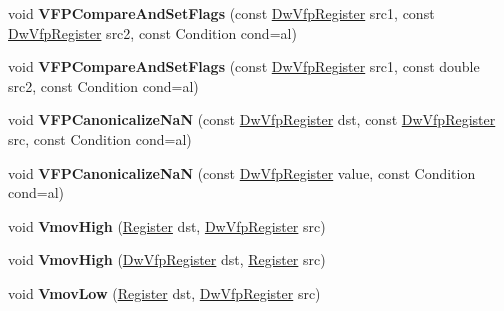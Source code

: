 \begin{DoxyCompactItemize}
void {\bfseries V\+F\+P\+Compare\+And\+Set\+Flags} (const \mbox{\hyperlink{classv8_1_1internal_1_1DwVfpRegister}{Dw\+Vfp\+Register}} src1, const \mbox{\hyperlink{classv8_1_1internal_1_1DwVfpRegister}{Dw\+Vfp\+Register}} src2, const Condition cond=al)
\item 
\mbox{\label{classv8_1_1internal_1_1TurboAssembler_afbe886e5139b5efc592447d5679801e0}} 
void {\bfseries V\+F\+P\+Compare\+And\+Set\+Flags} (const \mbox{\hyperlink{classv8_1_1internal_1_1DwVfpRegister}{Dw\+Vfp\+Register}} src1, const double src2, const Condition cond=al)
\item 
\mbox{\label{classv8_1_1internal_1_1TurboAssembler_a0633ee06e5e86c689c8e8defb1572681}} 
void {\bfseries V\+F\+P\+Canonicalize\+NaN} (const \mbox{\hyperlink{classv8_1_1internal_1_1DwVfpRegister}{Dw\+Vfp\+Register}} dst, const \mbox{\hyperlink{classv8_1_1internal_1_1DwVfpRegister}{Dw\+Vfp\+Register}} src, const Condition cond=al)
\item 
\mbox{\label{classv8_1_1internal_1_1TurboAssembler_a2fa0cfec1d6c47194dc178278c82daf7}} 
void {\bfseries V\+F\+P\+Canonicalize\+NaN} (const \mbox{\hyperlink{classv8_1_1internal_1_1DwVfpRegister}{Dw\+Vfp\+Register}} value, const Condition cond=al)
\item 
\mbox{\label{classv8_1_1internal_1_1TurboAssembler_a9b6bbd965f7ecc8e20c8af6ec03432b0}} 
void {\bfseries Vmov\+High} (\mbox{\hyperlink{classv8_1_1internal_1_1Register}{Register}} dst, \mbox{\hyperlink{classv8_1_1internal_1_1DwVfpRegister}{Dw\+Vfp\+Register}} src)
\item 
\mbox{\label{classv8_1_1internal_1_1TurboAssembler_a3bf659c33385caaea9ae6daa72846d4f}} 
void {\bfseries Vmov\+High} (\mbox{\hyperlink{classv8_1_1internal_1_1DwVfpRegister}{Dw\+Vfp\+Register}} dst, \mbox{\hyperlink{classv8_1_1internal_1_1Register}{Register}} src)
\item 
\mbox{\label{classv8_1_1internal_1_1TurboAssembler_ab5283ec1fa2b200416eac072ab3c30f2}} 
void {\bfseries Vmov\+Low} (\mbox{\hyperlink{classv8_1_1internal_1_1Register}{Register}} dst, \mbox{\hyperlink{classv8_1_1internal_1_1DwVfpRegister}{Dw\+Vfp\+Register}} src)

\end{DoxyCompactItemize}
